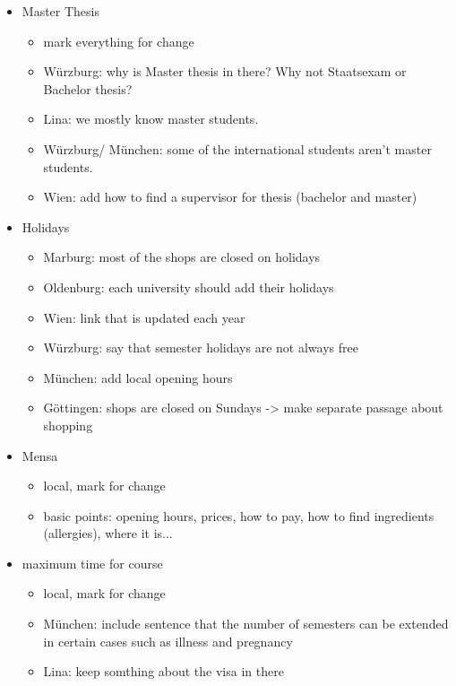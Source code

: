 \begin{itemize}
        \item Master Thesis
          \begin{itemize}
            \item mark everything for change
            \item Würzburg: why is Master thesis in there? Why not Staatsexam or Bachelor thesis?
            \item Lina: we mostly know master students.
            \item Würzburg/ München: some of the international students aren't master students.
            \item Wien: add how to find a supervisor for thesis (bachelor and master)
          \end{itemize}

        \item Holidays
          \begin{itemize}
            \item Marburg: most of the shops are closed on holidays
            \item Oldenburg: each university should add their holidays
            \item Wien: link that is updated each year
            \item Würzburg: say that semester holidays are not always free
            \item München: add local opening hours
            \item Göttingen: shops are closed on Sundays -> make separate passage about shopping
          \end{itemize}

        \item Mensa
          \begin{itemize}
            \item local, mark for change
            \item basic points: opening hours, prices, how to pay, how to find ingredients (allergies), where it is...
          \end{itemize}

        \item maximum time for course
          \begin{itemize}
            \item local, mark for change
            \item München: include sentence that the number of semesters can be extended in certain cases such as illness and pregnancy
            \item Lina: keep somthing about the visa in there
          \end{itemize}


\end{itemize}
